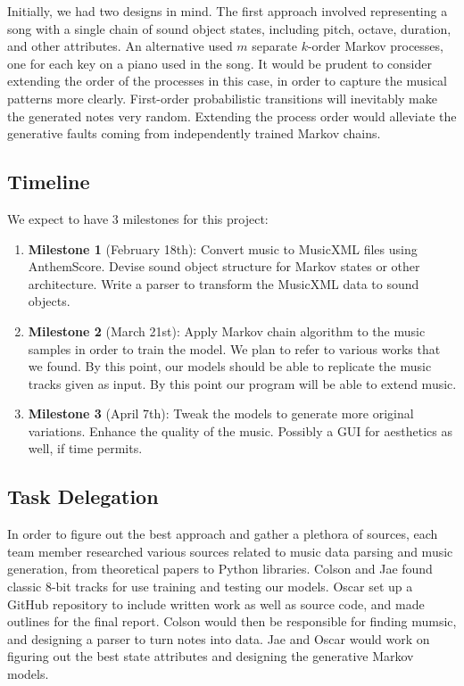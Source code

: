 \documentclass{article}
\begin{document}
Initially, we had two designs in mind. The first approach involved representing a song with a single chain of sound object states, including pitch, octave, duration, 
and other attributes. An alternative used $m$ separate $k$-order Markov processes, one for each key on a piano used in the song. It would be prudent to consider extending 
the order of the processes in this case, in order to capture the musical patterns more clearly. First-order probabilistic transitions will inevitably make the generated 
notes very random. Extending the process order would alleviate the generative faults coming from independently trained Markov chains.

\subsection{Timeline}
We expect to have 3 milestones for this project:
\begin{enumerate}
  \item \textbf{Milestone 1} (February 18th): Convert music to MusicXML files using AnthemScore. Devise sound object structure for Markov states or other architecture. 
  Write a parser to transform the MusicXML data to sound objects. 
  \item \textbf{Milestone 2} (March 21st): Apply Markov chain algorithm to the music samples in order to train the model. We plan to refer to various works that we found.
  By this point, our models should be able to replicate the music tracks given as input. By this point our program will be able to extend music.
  \item \textbf{Milestone 3} (April 7th): Tweak the models to generate more original variations. Enhance the quality of the music. Possibly a GUI for aesthetics as well, 
  if time permits.
\end{enumerate}

\subsection{Task Delegation}
In order to figure out the best approach and gather a plethora of sources, each team member researched various sources related to music data parsing and music generation, 
from theoretical papers to Python libraries. Colson and Jae found classic 8-bit tracks for use training and testing our models. Oscar set up a GitHub repository to include 
written work as well as source code, and made outlines for the final report. Colson would then be responsible for finding mumsic, and designing a parser to turn notes into 
data. Jae and Oscar would work on figuring out the best state attributes and designing the generative Markov models. 
\end{document}
